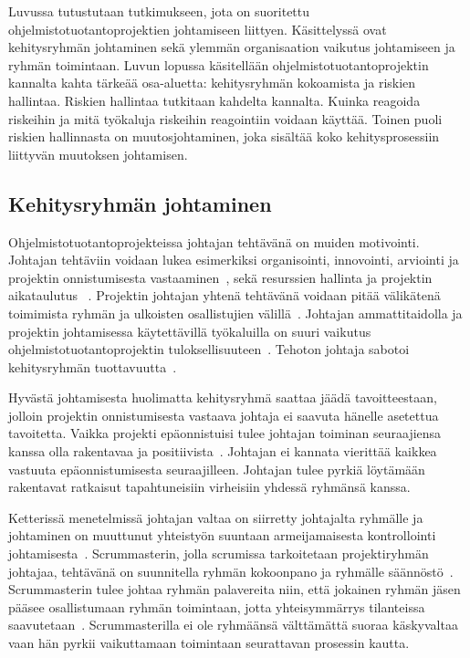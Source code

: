 \documentclass[finnish]{tktltiki2}
\theoremstyle{definition}
\theoremstyle{remark}
\begin{document}
Luvussa tutustutaan tutkimukseen, jota on suoritettu ohjelmistotuotantoprojektien johtamiseen liittyen. Käsittelyssä ovat kehitysryhmän johtaminen sekä ylemmän organisaation vaikutus johtamiseen ja ryhmän toimintaan. Luvun lopussa käsitellään ohjelmistotuotantoprojektin kannalta kahta tärkeää osa-aluetta: kehitysryhmän kokoamista ja riskien hallintaa. Riskien hallintaa tutkitaan kahdelta kannalta. Kuinka reagoida riskeihin ja mitä työkaluja riskeihin reagointiin voidaan käyttää. Toinen puoli riskien hallinnasta on muutosjohtaminen, joka sisältää koko kehitysprosessiin liittyvän muutoksen johtamisen.

\subsection{Kehitysryhmän johtaminen}

Ohjelmistotuotantoprojekteissa johtajan tehtävänä on muiden motivointi. Johtajan tehtäviin voidaan lukea esimerkiksi organisointi, innovointi, arviointi ja projektin onnistumisesta vastaaminen~\cite{4017705}, sekä resurssien hallinta ja projektin aikataulutus ~\cite{Dhomne:2012:ITL:2382887.2382899}. Projektin johtajan yhtenä tehtävänä voidaan pitää välikätenä toimimista ryhmän ja ulkoisten osallistujien välillä~\cite{McLeod:2011:FAS:1978802.1978803}. Johtajan ammattitaidolla ja projektin johtamisessa käytettävillä työkaluilla on suuri vaikutus ohjelmistotuotantoprojektin tuloksellisuuteen~\cite{McLeod:2011:FAS:1978802.1978803}. Tehoton johtaja sabotoi kehitysryhmän tuottavuutta~\cite{bradley1997effect}.

Hyvästä johtamisesta huolimatta kehitysryhmä saattaa jäädä tavoitteestaan, jolloin projektin onnistumisesta vastaava johtaja ei saavuta hänelle asetettua tavoitetta. Vaikka projekti epäonnistuisi tulee johtajan toiminan seuraajiensa kanssa olla rakentavaa ja positiivista~\cite{raccoon2006leadership}. Johtajan ei kannata vierittää kaikkea vastuuta epäonnistumisesta seuraajilleen. Johtajan tulee pyrkiä löytämään rakentavat ratkaisut tapahtuneisiin virheisiin yhdessä ryhmänsä kanssa.

Ketterissä menetelmissä johtajan valtaa on siirretty johtajalta ryhmälle ja johtaminen on muuttunut yhteistyön suuntaan armeijamaisesta kontrollointi johtamisesta~\cite{Nerur:2005:CMA:1060710.1060712}. Scrummasterin, jolla scrumissa tarkoitetaan projektiryhmän johtajaa, tehtävänä on suunnitella ryhmän kokoonpano ja ryhmälle säännöstö~\cite{4755768}. Scrummasterin tulee johtaa ryhmän palavereita niin, että jokainen ryhmän jäsen pääsee osallistumaan ryhmän toimintaan, jotta yhteisymmärrys tilanteissa saavutetaan~\cite{bradley1997effect}. Scrummasterilla ei ole ryhmäänsä välttämättä suoraa käskyvaltaa vaan hän pyrkii vaikuttamaan toimintaan seurattavan prosessin kautta.
\end{document}
